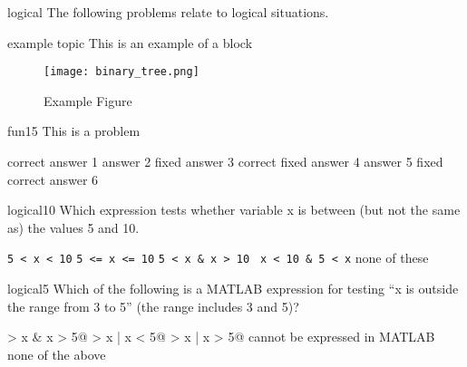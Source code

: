 \documentclass{exam}
\begin{document}

\begin{block}{logical}
The following problems relate to logical situations.
\end{block}

\begin{block}{example topic}
  This is an example of a block
\end{block}

\begin{figure}[placement h]
  \begin{center}
      \texttt{[image: binary\_tree.png]}
      \caption{Example Figure}
      \label{fig:example topic}
   \end{center}
\end{figure}

\begin{problem}{fun}{15}
  This is a problem
  \begin{answers}
    \answer[correct] correct answer 1
    \answer answer 2
    \answer[fixed] fixed answer 3
     correct fixed answer 4
    \answer answer 5
     fixed correct answer 6
  \end{answers}
\end{problem}

\begin{problem}[requires=logical]{logical}{10} 
  Which expression tests whether
  variable x is between (but not the same as) the values 5 and 10.
  \begin{answers}
    \answer \verb+5 < x < 10+
    \answer \verb+5 <= x <= 10+
    \answer \verb+5 < x & x > 10 +
    \answer[correct] \verb+x < 10 & 5 < x+ %
    \answer[fixed] none of these  %
  \end{answers}
\end{problem}

\begin{problem}[requires=logical]{logical}{5} 
  Which of the following is a MATLAB expression for testing ``x is
  outside the range from 3 to 5'' (the range includes 3 and 5)? 
  \begin{answers}  
    \answer {} > x & x > 5@
    \answer {} > x | x < 5@
    \answer[correct]  > x | x > 5@ %
    \answer[fixed] cannot be expressed in MATLAB %
    \answer[fixed] none of the above %
  \end{answers}
\end{problem}
\end{document}
